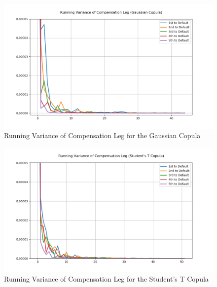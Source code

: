 \documentclass{report}
\theoremstyle{plain}
\theoremstyle{definition}
\begin{document}
\begin{figure}[H]
	\begin{center}
		\includegraphics[width=15cm]{Running_Variance_of_Compensation_Leg_(Gaussian_Copula).png}
		\caption{Running Variance of Compensation Leg for the Gaussian Copula} 
		\label{Running_Variance_of_Compensation_Leg_(Gaussian_Copula)}
	\end{center}
\end{figure}

\begin{figure}[H]
	\begin{center}
		\includegraphics[width=15cm]{Running_Variance_of_Compensation_Leg_(Student's_T_Copula).png}
		\caption{Running Variance of Compensation Leg for the Student's T Copula} 
		\label{Running_Variance_of_Compensation_Leg_(Student's_T_Copula)}
	\end{center}
\end{figure}
\end{document}
